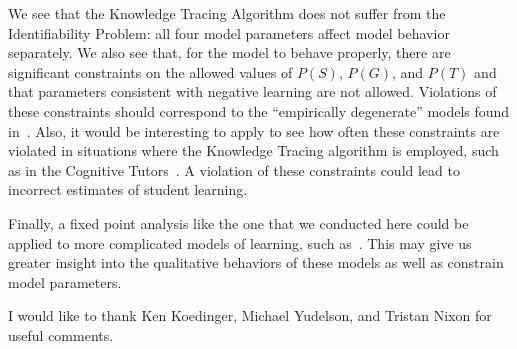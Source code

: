 \documentclass{acmlarge-edm}
\begin{document}
We see that the Knowledge Tracing Algorithm does not suffer from
the Identifiability Problem:  all four model parameters
affect model behavior separately.  
We also see that, for the model to behave properly,  there are 
significant constraints on the allowed values of $P(S)$, $P(G)$, and $P(T)$
and that parameters consistent with negative learning are not allowed.
Violations of these constraints should correspond to the ``empirically
degenerate'' models found in~\cite{baker_more_2008}.
Also, it would be interesting to apply to see how often these constraints are
violated in situations where the  Knowledge Tracing algorithm is
employed, such as in the Cognitive Tutors~\cite{ritter_cognitive_2007}.
A violation of these constraints could lead to incorrect estimates of
student learning.

Finally, a fixed point analysis like the one that we conducted here could be
applied to more complicated models of learning, such 
as~\cite{baker_improving_2008,lee_impact_2012}.  This may give us
greater insight into the qualitative behaviors of these models as well
as constrain model parameters.


\begin{acks}
I would like to thank Ken Koedinger, Michael Yudelson, and Tristan Nixon for
useful comments.
\end{acks}


\end{document}
